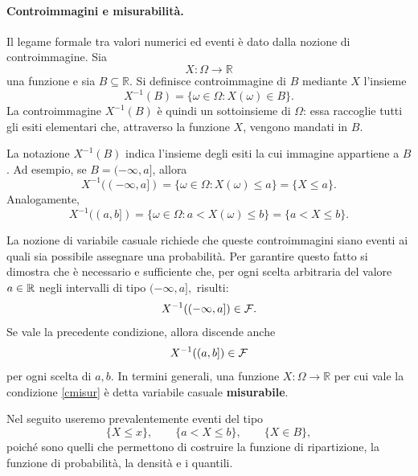\paragraph{Controimmagini e misurabilit\`{a}.}

Il legame formale tra valori numerici ed eventi \`{e} dato dalla nozione di
controimmagine. Sia
\[
X:\Omega\longrightarrow\mathbb{R}
\]
una funzione e sia $B\subseteq\mathbb{R}$. Si definisce controimmagine di $B$
mediante $X$ l'insieme
\[
X^{-1}(B)=\{\omega\in\Omega:X(\omega)\in B\}.
\]
La controimmagine $X^{-1}(B)$ \`{e} quindi un sottoinsieme di $\Omega$: essa
raccoglie tutti gli esiti elementari che, attraverso la funzione $X$, vengono
mandati in $B$.

La notazione $X^{-1}(B)$ indica l'insieme degli esiti la cui immagine
appartiene a $B$. Ad esempio, se $B=(-\infty,a]$, allora
\[
X^{-1}((-\infty,a]) = \{\omega\in\Omega:X(\omega)\leq a\} = \{X\leq a\}.
\]
Analogamente,
\[
X^{-1}((a,b]) = \{\omega\in\Omega:a<X(\omega)\leq b\} = \{a<X\leq b\}.
\]


La nozione di variabile casuale richiede che queste controimmagini siano
eventi ai quali sia possibile assegnare una probabilit\`{a}. Per garantire
questo fatto si dimostra che \`{e} necessario e sufficiente che, per ogni
scelta arbitraria del valore $a\in\mathbb{R}$ negli intervalli di tipo
$(-\infty,a],$ risulti:%
\begin{equation}
X^{-1}((-\infty,a])\in\F.\label{cmisur}%
\end{equation}
Se vale la precedente condizione, allora discende anche
\[
X^{-1}((a,b])\in\F%
\]
per ogni scelta di $a,b$.  In termini generali, una funzione $X:\Omega
\rightarrow\mathbb{R}$ per cui vale la condizione \ref{cmisur} \`{e} detta
variabile casuale \textbf{misurabile}.

Nel seguito useremo prevalentemente eventi del tipo
\[
\{X\leq x\},\qquad\{a<X\leq b\},\qquad\{X\in B\},
\]
poich\'{e} sono quelli che permettono di costruire la funzione di
ripartizione, la funzione di probabilit\`{a}, la densit\`{a} e i quantili.

